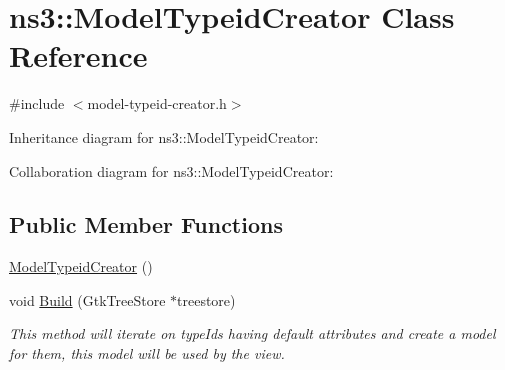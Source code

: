 \hypertarget{classns3_1_1ModelTypeidCreator}{}\section{ns3\+:\+:Model\+Typeid\+Creator Class Reference}
\label{classns3_1_1ModelTypeidCreator}


{\ttfamily \#include $<$model-\/typeid-\/creator.\+h$>$}



Inheritance diagram for ns3\+:\+:Model\+Typeid\+Creator\+:


Collaboration diagram for ns3\+:\+:Model\+Typeid\+Creator\+:
\subsection*{Public Member Functions}
\begin{DoxyCompactItemize}
\item 
\hyperlink{classns3_1_1ModelTypeidCreator_a670d4773418d95127a3d212dd5411602}{Model\+Typeid\+Creator} ()
\item 
void \hyperlink{classns3_1_1ModelTypeidCreator_a6555895ba2889296cf7206c5be6d63e7}{Build} (Gtk\+Tree\+Store $\ast$treestore)
\begin{DoxyCompactList}\small\item\em This method will iterate on type\+Ids having default attributes and create a model for them, this model will be used by the view. \end{DoxyCompactList}\end{DoxyCompactItemize}
